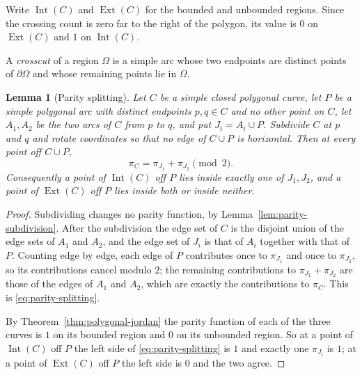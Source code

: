 \documentclass[11pt]{article}
\theoremstyle{mainplain}
\newtheorem{lemma}[theorem]{Lemma}
\theoremstyle{mainroman}
\theoremstyle{definition}
\numberwithin{equation}{section}
\begin{document}
Write $\operatorname{Int}(C)$ and $\operatorname{Ext}(C)$ for the
bounded and unbounded regions. Since the crossing count is zero far to
the right of the polygon, its value is $0$ on
$\operatorname{Ext}(C)$ and $1$ on $\operatorname{Int}(C)$.

A \emph{crosscut} of a region $\Omega$ is a simple arc whose two
endpoints are distinct points of $\partial\Omega$ and whose remaining
points lie in $\Omega$.

\begin{lemma}[Parity splitting]\label{lem:parity-splitting}
Let $C$ be a simple closed polygonal curve, let $P$ be a simple
polygonal arc with distinct endpoints $p,q\in C$ and no other point on
$C$, let $A_1,A_2$ be the two arcs of $C$ from $p$ to $q$, and put
$J_i=A_i\cup P$. Subdivide $C$ at $p$ and $q$ and rotate coordinates so
that no edge of $C\cup P$ is horizontal. Then at every point off
$C\cup P$,
\begin{equation}\label{eq:parity-splitting}
 \pi_C=\pi_{J_1}+\pi_{J_2}\pmod 2.
\end{equation}
Consequently a point of $\operatorname{Int}(C)$ off $P$ lies inside
exactly one of $J_1,J_2$, and a point of $\operatorname{Ext}(C)$ off
$P$ lies inside both or inside neither.
\end{lemma}
\begin{proof}
Subdividing changes no parity function, by
Lemma~\ref{lem:parity-subdivision}. After the subdivision the edge set
of $C$ is the disjoint union of the edge sets of $A_1$ and $A_2$, and
the edge set of $J_i$ is that of $A_i$ together with that of $P$.
Counting edge by edge, each edge of $P$ contributes once to
$\pi_{J_1}$ and once to $\pi_{J_2}$, so its contributions cancel modulo
$2$; the remaining contributions to $\pi_{J_1}+\pi_{J_2}$ are those of
the edges of $A_1$ and $A_2$, which are exactly the contributions to
$\pi_C$. This is \eqref{eq:parity-splitting}.

By Theorem~\ref{thm:polygonal-jordan} the parity function of each of
the three curves is $1$ on its bounded region and $0$ on its unbounded
region. So at a point of $\operatorname{Int}(C)$ off $P$ the left side
of \eqref{eq:parity-splitting} is $1$ and exactly one $\pi_{J_i}$ is
$1$; at a point of $\operatorname{Ext}(C)$ off $P$ the left side is $0$
and the two agree.
\end{proof}
\end{document}
